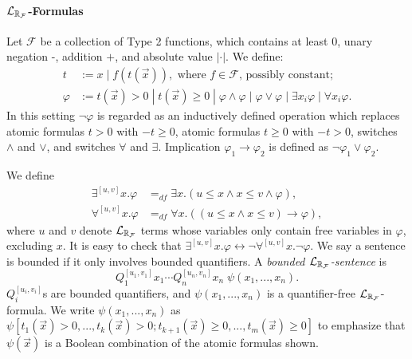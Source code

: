 \paragraph{$\mathcal{L}_{\mathbb{R}_{\mathcal{F}}}$-Formulas}
Let $\mathcal{F}$ be a collection of Type 2 functions, which contains at least
$0$, unary negation -, addition $+$, and absolute value $|\cdot|$. We define:
\begin{align*}
t& := x \; | \; f(t(\vec x)), \mbox{ where }f\in \mathcal{F}\mbox{, possibly
constant};\\
\varphi& := t(\vec x)> 0 \; | \; t(\vec x)\geq 0 \; | \; \varphi\wedge\varphi
\; | \; \varphi\vee\varphi \; | \; \exists x_i\varphi \; |\; \forall x_i\varphi.
\end{align*}
In this setting $\neg\varphi$ is regarded as an inductively defined operation
which replaces atomic formulas $t>0$ with $-t\geq 0$, atomic formulas $t\geq 0$
with $-t>0$, switches $\wedge$ and $\vee$, and switches $\forall$ and $\exists$.
Implication $\varphi_1\rightarrow\varphi_2$ is defined as
$\neg\varphi_1\vee\varphi_2$.

We define
\begin{align*}
\exists^{[u,v]}x.\varphi &=_{df}\exists x. ( u \leq x \land x \leq v \wedge
\varphi),\\
\forall^{[u,v]}x.\varphi &=_{df} \forall x. ( (u \leq x \land x \leq v)
\rightarrow \varphi),
\end{align*}
where $u$ and $v$ denote $\mathcal{L}_{\mathbb{R}_{\mathcal{F}}}$ terms whose variables only
contain free variables in $\varphi$, excluding $x$. It is easy to check that
$\exists^{[u,v]}x. \varphi \leftrightarrow \neg \forall^{[u,v]}x. \neg\varphi$.
We say a sentence is bounded if it only involves bounded quantifiers.
A {\em bounded $\mathcal{L}_{\mathbb{R}_{\mathcal{F}}}$-sentence} is
$$Q_1^{[u_1,v_1]}x_1\cdots Q_n^{[u_n,v_n]}x_n\;\psi(x_1,...,x_n).$$
$Q_i^{[u_i,v_i]}$s are bounded quantifiers, and $\psi(x_1,...,x_n)$ is a
quantifier-free $\mathcal{L}_{\mathbb{R}_{\mathcal{F}}}$-formula.
We write $\psi(x_1,...,x_n)$ as $\psi[t_1(\vec
x)>0,...,t_k(\vec x)>0; t_{k+1}(\vec x)\geq 0,...,t_m(\vec
x)\geq 0]$ to emphasize that $\psi(\vec x)$ is a Boolean
combination of the atomic formulas shown.
